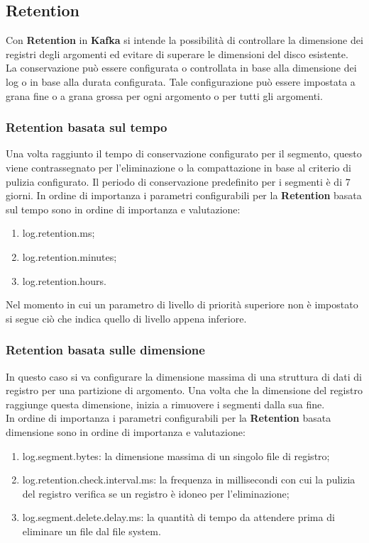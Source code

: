 \documentclass{article}
\begin{document}
\subsection{Retention}
Con \textbf{Retention} in \textbf{Kafka} si intende la possibilità di controllare la dimensione dei registri degli argomenti ed evitare di superare le dimensioni del disco esistente.\\La conservazione può essere configurata o controllata in base alla dimensione dei log o in base alla durata configurata.
Tale configurazione può essere impostata a grana fine o a grana grossa per ogni argomento o per tutti gli argomenti.\\
\subsubsection{Retention basata sul tempo}
Una volta raggiunto il tempo di conservazione configurato per il segmento, questo viene contrassegnato per l'eliminazione o la compattazione in base al criterio di pulizia configurato. Il periodo di conservazione predefinito per i segmenti è di 7 giorni.
In ordine di importanza i parametri configurabili per la    \textbf{Retention} basata sul tempo sono in ordine di importanza e valutazione:
\begin{enumerate}
    \item log.retention.ms;
    \item log.retention.minutes;
    \item log.retention.hours.
\end{enumerate}
Nel momento in cui un parametro di livello di priorità superiore non è impostato si segue ciò che indica quello di livello appena inferiore.
\subsubsection{Retention basata sulle dimensione}
In questo caso si va 
configurare la dimensione massima di una struttura di dati di registro per una partizione di argomento. Una volta che la dimensione del registro raggiunge questa dimensione, inizia a rimuovere i segmenti dalla sua fine.
\\
In ordine di importanza i parametri configurabili per la    \textbf{Retention} basata dimensione sono in ordine di importanza e valutazione:
\begin{enumerate}
    \item log.segment.bytes: la dimensione massima di un singolo file di registro;
    \item log.retention.check.interval.ms: la frequenza in millisecondi con cui la pulizia del registro verifica se un registro è idoneo per l'eliminazione;
    \item log.segment.delete.delay.ms: la quantità di tempo da attendere prima di eliminare un file dal file system.
\end{enumerate}
\end{document}
